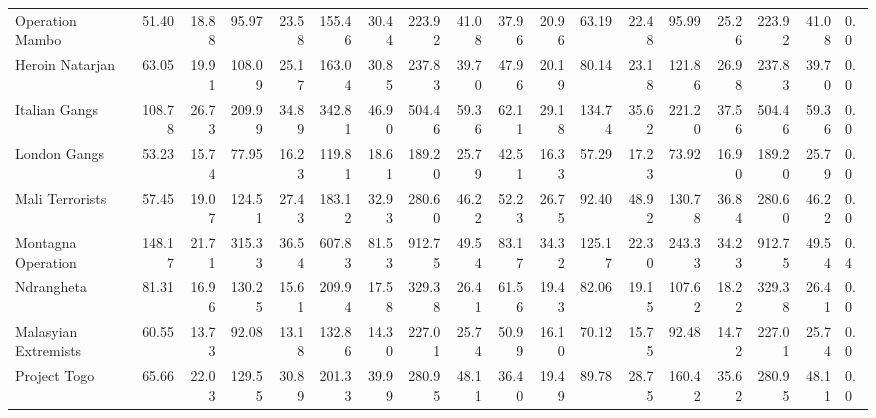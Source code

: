 \begin{tabular}{lrrrrrrrrrrrrrrrrl}
Operation Mambo      &             51.40 &  18.88 &   95.97 &  23.58 &  155.46 &  30.44 &  223.92 &  41.08 &            37.96 &   20.96 &   63.19 &   22.48 &   95.99 &   25.26 &  223.92 &  41.08 &        0.0 \\
Heroin Natarjan      &             63.05 &  19.91 &  108.09 &  25.17 &  163.04 &  30.85 &  237.83 &  39.70 &            47.96 &   20.19 &   80.14 &   23.18 &  121.86 &   26.98 &  237.83 &  39.70 &        0.0 \\
Italian Gangs        &            108.78 &  26.73 &  209.99 &  34.89 &  342.81 &  46.90 &  504.46 &  59.36 &            62.11 &   29.18 &  134.74 &   35.62 &  221.20 &   37.56 &  504.46 &  59.36 &        0.0 \\
London Gangs         &             53.23 &  15.74 &   77.95 &  16.23 &  119.81 &  18.61 &  189.20 &  25.79 &            42.51 &   16.33 &   57.29 &   17.23 &   73.92 &   16.90 &  189.20 &  25.79 &        0.0 \\
Mali Terrorists      &             57.45 &  19.07 &  124.51 &  27.43 &  183.12 &  32.93 &  280.60 &  46.22 &            52.23 &   26.75 &   92.40 &   48.92 &  130.78 &   36.84 &  280.60 &  46.22 &        0.0 \\
Montagna Operation   &            148.17 &  21.71 &  315.33 &  36.54 &  607.83 &  81.53 &  912.75 &  49.54 &            83.17 &   34.32 &  125.17 &   22.30 &  243.33 &   34.23 &  912.75 &  49.54 &        0.4 \\
Ndrangheta           &             81.31 &  16.96 &  130.25 &  15.61 &  209.94 &  17.58 &  329.38 &  26.41 &            61.56 &   19.43 &   82.06 &   19.15 &  107.62 &   18.22 &  329.38 &  26.41 &        0.0 \\
Malasyian Extremists &             60.55 &  13.73 &   92.08 &  13.18 &  132.86 &  14.30 &  227.01 &  25.74 &            50.99 &   16.10 &   70.12 &   15.75 &   92.48 &   14.72 &  227.01 &  25.74 &        0.0 \\
Project Togo         &             65.66 &  22.03 &  129.55 &  30.89 &  201.33 &  39.99 &  280.95 &  48.11 &            36.40 &   19.49 &   89.78 &   28.75 &  160.42 &   35.62 &  280.95 &  48.11 &        0.0 \\
\bottomrule
\end{tabular}
